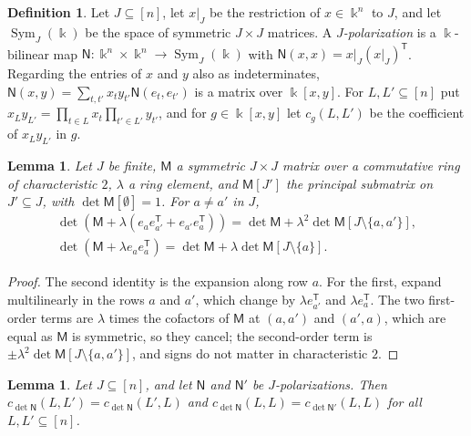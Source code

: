 \documentclass[11pt]{amsart}
\newtheorem{lemma}[theorem]{Lemma}
\theoremstyle{definition}
\newtheorem{definition}[theorem]{Definition}
\theoremstyle{remark}
\numberwithin{equation}{section}
\theoremstyle{plain}
\theoremstyle{definition}
\theoremstyle{plain}
\begin{document}
\begin{definition}\label{ocl:def:polarization}
Let $J\subseteq[n]$, let $x|_J$ be the restriction of $x\in\Bbbk^n$ to $J$, and let $\operatorname{Sym}_J(\Bbbk)$ be the
space of symmetric $J\times J$ matrices. A \emph{$J$-polarization} is a $\Bbbk$-bilinear map $\mathsf
N\colon\Bbbk^n\times\Bbbk^n\to\operatorname{Sym}_J(\Bbbk)$ with $\mathsf N(x,x)=x|_J(x|_J)^{\mathsf T}$. Regarding the
entries of $x$ and $y$ also as indeterminates, $\mathsf N(x,y)=\sum_{t,t'}x_ty_{t'}\mathsf N(e_t,e_{t'})$ is a matrix
over $\Bbbk[x,y]$. For $L,L'\subseteq[n]$ put $x_Ly_{L'}=\prod_{t\in L}x_t\prod_{t'\in L'}y_{t'}$, and for
$g\in\Bbbk[x,y]$ let $c_g(L,L')$ be the coefficient of $x_Ly_{L'}$ in $g$.
\end{definition}

\begin{lemma}\label{ocl:lem:update}
Let $J$ be finite, $\mathsf M$ a symmetric $J\times J$ matrix over a commutative ring of characteristic $2$, $\lambda$ a
ring element, and $\mathsf M[J']$ the principal submatrix on $J'\subseteq J$, with $\det\mathsf M[\emptyset]=1$. For
$a\ne a'$ in $J$,
\begin{gather*}
 \det(\mathsf M+\lambda(e_ae_{a'}^{\mathsf T}+e_{a'}e_a^{\mathsf T}))=\det\mathsf M+\lambda^2\det\mathsf
M[J\setminus\{a,a'\}],\\
 \det(\mathsf M+\lambda e_ae_a^{\mathsf T})=\det\mathsf M+\lambda\det\mathsf M[J\setminus\{a\}].
\end{gather*}
\end{lemma}

\begin{proof}
The second identity is the expansion along row $a$. For the first, expand multilinearly in the rows $a$ and $a'$, which
change by $\lambda e_{a'}^{\mathsf T}$ and $\lambda e_a^{\mathsf T}$. The two first-order terms are $\lambda$ times the
cofactors of $\mathsf M$ at $(a,a')$ and $(a',a)$, which are equal as $\mathsf M$ is symmetric, so they cancel; the
second-order term is $\pm\lambda^2\det\mathsf M[J\setminus\{a,a'\}]$, and signs do not matter in characteristic $2$.
\end{proof}

\begin{lemma}\label{ocl:lem:polarizations}
Let $J\subseteq[n]$, and let $\mathsf N$ and $\mathsf N'$ be $J$-polarizations. Then $c_{\det\mathsf
N}(L,L')=c_{\det\mathsf N}(L',L)$ and $c_{\det\mathsf N}(L,L)=c_{\det\mathsf N'}(L,L)$ for all $L,L'\subseteq[n]$.
\end{lemma}
\end{document}
